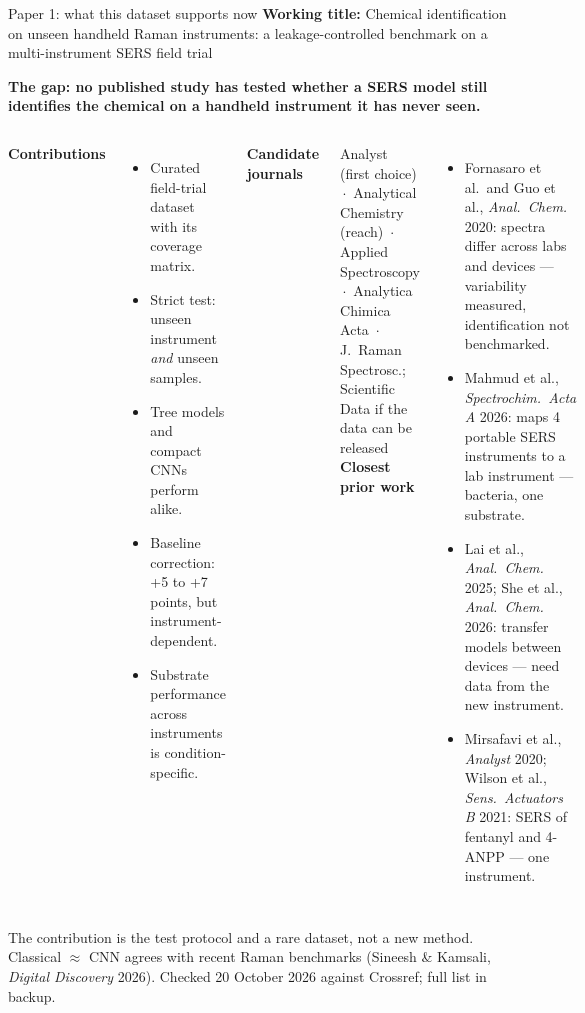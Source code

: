 \documentclass[aspectratio=169,10pt]{beamer}
\newcommand{\gapbox}[1]{%
  \par\smallskip\noindent\colorbox{cGap}{\parbox{\dimexpr\textwidth-2\fboxsep\relax}{\centering\bfseries\vspace{2pt}#1\par\vspace{2pt}}}\par\smallskip}
\newcommand{\src}[1]{{\par\vspace{1pt}\tiny\color{cInk2}#1\par}}
\begin{document}
\begin{frame}{Paper 1: what this dataset supports now}
\textbf{Working title:} Chemical identification on unseen handheld Raman instruments: a leakage-controlled benchmark on a multi-instrument SERS field trial
\gapbox{The gap: no published study has tested whether a SERS model still identifies the chemical on a handheld instrument it has never seen.}

\begin{columns}[T,onlytextwidth]
\textbf{Contributions}
\begin{itemize}\small
  \item Curated field-trial dataset with its coverage matrix.
  \item Strict test: unseen instrument \emph{and} unseen samples.
  \item Tree models and compact CNNs perform alike.
  \item Baseline correction: +5 to +7 points, but instrument-dependent.
  \item Substrate performance across instruments is condition-specific.
\end{itemize}

\smallskip
{\small\textbf{Candidate journals}}\par
\scriptsize Analyst (first choice) \,$\cdot$\, Analytical Chemistry (reach) \,$\cdot$\, Applied Spectroscopy \,$\cdot$\, Analytica Chimica Acta \,$\cdot$\, J.\ Raman Spectrosc.; Scientific Data if the data can be released
\textbf{Closest prior work}\par
\scriptsize
\begin{itemize}
  \item Fornasaro et al.\ and Guo et al., \emph{Anal.\ Chem.} 2020: spectra differ across labs and devices --- variability measured, identification not benchmarked.
  \item Mahmud et al., \emph{Spectrochim.\ Acta A} 2026: maps 4 portable SERS instruments to a lab instrument --- bacteria, one substrate.
  \item Lai et al., \emph{Anal.\ Chem.} 2025; She et al., \emph{Anal.\ Chem.} 2026: transfer models between devices --- need data from the new instrument.
  \item Mirsafavi et al., \emph{Analyst} 2020; Wilson et al., \emph{Sens.\ Actuators B} 2021: SERS of fentanyl and 4-ANPP --- one instrument.
\end{itemize}


\end{columns}
\src{The contribution is the test protocol and a rare dataset, not a new method. Classical $\approx$ CNN agrees with recent Raman benchmarks (Sineesh \& Kamsali, \emph{Digital Discovery} 2026). Checked 20 October 2026 against Crossref; full list in backup.}
\end{frame}
\end{document}
